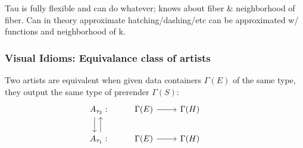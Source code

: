 \documentclass[../main.tex]{subfiles}
\begin{document}
Tau is fully flexible and can do whatever; knows about fiber \& neighborhood of fiber. Can in theory approximate hatching/dashing/etc can be approximated w/ functions and neighborhood of k. 


\subsubsection{Visual Idioms: Equivalance class of artists}
Two artists are equivalent when given data containers $\Gamma(E)$ of the same type, they output the same type of prerender $\Gamma(S)$:
\begin{equation}
    \begin{tikzcd}
        A_{\tau_2}: \arrow[d, shift right=2] & \Gamma(E) \arrow[r] & \Gamma(H) &                                                \\
        A_{\tau_1}: \arrow[u, shift right]   & \Gamma(E) \arrow[r] & \Gamma(H) 
    \end{tikzcd}
\end{equation}
\end{document}
